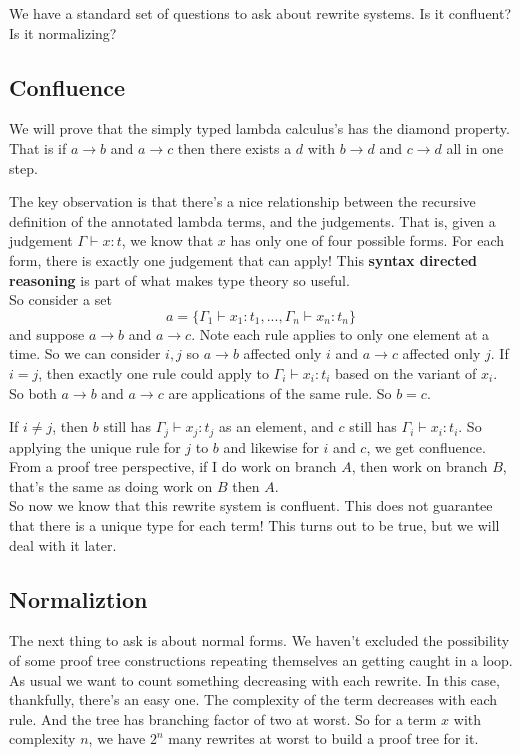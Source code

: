 \documentclass[12pt]{article}
\begin{document}
We have a standard set of questions to ask about rewrite systems.
Is it confluent? Is it normalizing?

\subsection{Confluence}
We will prove that the simply typed lambda calculus's has the diamond property. 
That is if $a \rightarrow b$ and $a \rightarrow c$ then there exists a $d$ with $b \rightarrow d$ and $c \rightarrow d$ all in one step.

The key observation is that there's a nice relationship between the recursive definition of the annotated lambda terms, and the judgements.
That is, given a judgement $\Gamma \vdash x:t$, we know that $x$ has only one of four possible forms. For each form, there is exactly one judgement that can apply! This \textbf{syntax directed reasoning} is part of what makes type theory so useful.
\\ \newline
So consider a set 
\[
  a = \{\Gamma_1\vdash x_1 : t_1,..., \Gamma_n\vdash x_n : t_n \}
\]
and suppose $a \rightarrow b$ and $a \rightarrow c$.
Note each rule applies to only one element at a time.
So we can consider $i,j$ so $a \rightarrow b$ affected only $i$ and $a \rightarrow c$ affected only $j$.
If $i = j$, then exactly one rule could apply to $\Gamma_i \vdash x_i:t_i$ based on the variant of $x_i$. So both $a \rightarrow b$ and $a \rightarrow c$ are applications of the same rule. So $b = c$.

If $i \neq j$, then $b$ still has $\Gamma_j \vdash x_j:t_j$ as an element, and $c$ still has $\Gamma_i \vdash x_i:t_i$.
So applying the unique rule for $j$ to $b$ and likewise for $i$ and $c$, we get confluence.
From a proof tree perspective, if I do work on branch $A$, then work on branch $B$, that's the same as doing work on $B$ then $A$.
\\ \newline
So now we know that this rewrite system is confluent.
This does not guarantee that there is a unique type for each term!
This turns out to be true, but we will deal with it later.

\subsection{Normaliztion}
The next thing to ask is about normal forms.
We haven't excluded the possibility of some proof tree constructions repeating themselves an getting caught in a loop.
As usual we want to count something decreasing with each rewrite.
In this case, thankfully, there's an easy one.
The complexity of the term decreases with each rule.
And the tree has branching factor of two at worst.
So for a term $x$ with complexity $n$, we have $2^n$ many rewrites at worst to build a proof tree for it.
\end{document}
